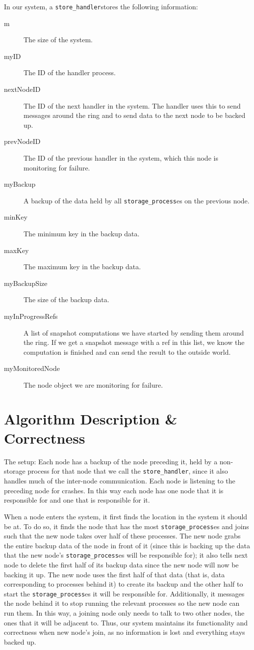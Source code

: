 \documentclass[12pt,letterpaper]{article}
\renewcommand{\tt}[1]{\texttt{#1}}
\newcommand{\sh}{\tt{store\_handler}}
\renewcommand{\sp}{\tt{storage\_process}}
\begin{document}
In our system, a \sh stores the following information:
\begin{description}
\item [m] The size of the system.
\item [myID] The ID of the handler process.
\item [nextNodeID] The ID of the next handler in the system. The handler uses this to send messages around the ring and to send data to the next node to be backed up.
\item [prevNodeID] The ID of the previous handler in the system, which this node is monitoring for failure.
\item [myBackup] A backup of the data held by all \sp es on the previous node.
\item [minKey] The minimum key in the backup data.
\item [maxKey] The maximum key in the backup data.
\item [myBackupSize] The size of the backup data.
\item [myInProgressRefs] A list of snapshot computations we have started by sending them around the ring. If we get a snapshot message with a ref in this list, we know the computation is finished and can send the result to the outside world.
\item [myMonitoredNode] The node object we are monitoring for failure.
\end{description}

\section*{Algorithm Description \& Correctness}
The setup:
Each node has a backup of the node preceding it, held by a non-storage process for that node that we call the \sh, since it also handles much of the inter-node communication. Each node is listening to the preceding node for crashes. In this way each node has one node that it is responsible for and one that is responsible for it.

When a node enters the system, it first finds the location in the system it should be at. To do so, it finds the node that has the most \sp es and joins such that the new node takes over half of these processes. The new node grabs the entire backup data of the node in front of it (since this is backing up the data that the new node's \sp es will be responsible for); it also tells next node to delete the first half of its backup data since the new node will now be backing it up. The new node uses the first half of that data (that is, data corresponding to processes behind it) to create its backup and the other half to start the \sp es it will be responsible for. Additionally, it messages the node behind it to stop running the relevant processes so the new node can run them. In this way, a joining node only needs to talk to two other nodes, the ones that it will be adjacent to. Thus, our system maintains its functionality and correctness when new node's join, as no information is lost and everything stays backed up.
\end{document}
